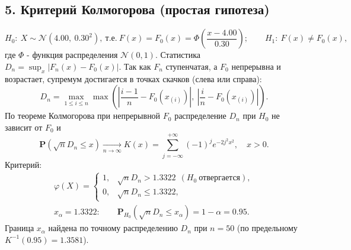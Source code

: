 \documentclass[12pt]{spbstu-task}
\renewcommand{\Prob}{\mathbf{P}}
\begin{document}
\subsection*{5. Критерий Колмогорова (простая гипотеза)}
\begin{displaymath}
  H_0:\ X \sim \mathcal{N}(4.00,\ 0.30^2),\ \text{т.е.}\ F(x) = F_0(x) = \Phi\left(\frac{x - 4.00}{0.30}\right);\qquad
  H_1:\ F(x) \ne F_0(x),
\end{displaymath}
где \(\Phi\) - функция распределения \(\mathcal{N}(0, 1)\). Статистика \(D_n = \sup_x\left|F_n(x) - F_0(x)\right|\). Так как \(F_n\) ступенчатая, а \(F_0\)
непрерывна и возрастает, супремум достигается в точках скачков (слева или справа):
\begin{displaymath}
  D_n = \max_{1 \le i \le n}\max\left(\left|\frac{i - 1}{n} - F_0\left(x_{(i)}\right)\right|,\
  \left|\frac{i}{n} - F_0\left(x_{(i)}\right)\right|\right).
\end{displaymath}
По теореме Колмогорова при непрерывной \(F_0\) распределение \(D_n\) при \(H_0\) не зависит от \(F_0\) и
\begin{displaymath}
  \Prob\left(\sqrt{n}D_n \le x\right) \xrightarrow[n\to\infty]{} K(x) = \sum_{j=-\infty}^{+\infty}(-1)^{j}e^{-2j^2x^2},\quad x > 0.
\end{displaymath}
Критерий:
\begin{gather*}
  \varphi(X) =
  \begin{cases}
    1, & \sqrt{n}D_n > 1.3322\ \ (H_0\ \text{отвергается}),\\
    0, & \sqrt{n}D_n \le 1.3322,
  \end{cases}\\
  x_\alpha = 1.3322:\qquad \Prob_{H_0}\left(\sqrt{n}D_n \le x_\alpha\right) = 1 - \alpha = 0.95.
\end{gather*}
Граница \(x_\alpha\) найдена по точному распределению \(D_n\) при \(n = 50\) (по предельному \(K^{-1}(0.95) = 1.3581\)).
\end{document}
